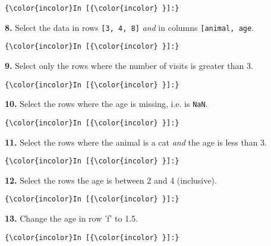 \documentclass[11pt]{article}
\begin{document}
    \begin{Verbatim}[commandchars=\\\{\}]
{\color{incolor}In [{\color{incolor} }]:} 
\end{Verbatim}


    \textbf{8.} Select the data in rows \texttt{{[}3,\ 4,\ 8{]}} \emph{and}
in columns
\texttt{{[}\textquotesingle{}animal\textquotesingle{},\ \textquotesingle{}age\textquotesingle{}{]}}.

    \begin{Verbatim}[commandchars=\\\{\}]
{\color{incolor}In [{\color{incolor} }]:} 
\end{Verbatim}


    \textbf{9.} Select only the rows where the number of visits is greater
than 3.

    \begin{Verbatim}[commandchars=\\\{\}]
{\color{incolor}In [{\color{incolor} }]:} 
\end{Verbatim}


    \textbf{10.} Select the rows where the age is missing, i.e. is
\texttt{NaN}.

    \begin{Verbatim}[commandchars=\\\{\}]
{\color{incolor}In [{\color{incolor} }]:} 
\end{Verbatim}


    \textbf{11.} Select the rows where the animal is a cat \emph{and} the
age is less than 3.

    \begin{Verbatim}[commandchars=\\\{\}]
{\color{incolor}In [{\color{incolor} }]:} 
\end{Verbatim}


    \textbf{12.} Select the rows the age is between 2 and 4 (inclusive).

    \begin{Verbatim}[commandchars=\\\{\}]
{\color{incolor}In [{\color{incolor} }]:} 
\end{Verbatim}


    \textbf{13.} Change the age in row 'f' to 1.5.

    \begin{Verbatim}[commandchars=\\\{\}]
{\color{incolor}In [{\color{incolor} }]:} 
\end{Verbatim}
\end{document}

